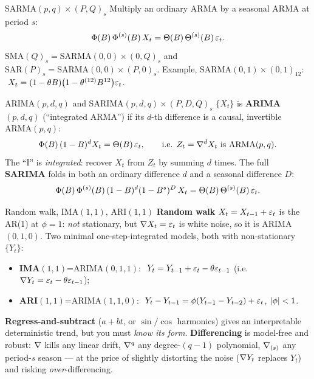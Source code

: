 \documentclass[11pt]{article}
\begin{document}
\begin{defn}{SARMA$(p,q)\times(P,Q)_s$}
Multiply an ordinary ARMA by a seasonal ARMA at period $s$:
\[
\Phi(B)\,\Phi^{(s)}(B)\,X_t=\Theta(B)\,\Theta^{(s)}(B)\,\varepsilon_t .
\]
$\mathrm{SMA}(Q)_s=\mathrm{SARMA}(0,0)\times(0,Q)_s$ and $\mathrm{SAR}(P)_s=\mathrm{SARMA}(0,0)\times(P,0)_s$. Example, $\mathrm{SARMA}(0,1)\times(0,1)_{12}$: $\ X_t=(1-\theta B)\bigl(1-\theta^{(12)}B^{12}\bigr)\varepsilon_t$.
\end{defn}

\begin{defn}{ARIMA$(p,d,q)$ and SARIMA$(p,d,q)\times(P,D,Q)_s$}
$\{X_t\}$ is \textbf{ARIMA$(p,d,q)$} (``integrated ARMA'') if its $d$-th difference is a causal, invertible ARMA$(p,q)$:
\[
\Phi(B)\,(1-B)^{d}X_t=\Theta(B)\,\varepsilon_t ,\qquad\text{i.e. } Z_t=\nabla^{d}X_t \text{ is ARMA}(p,q).
\]
The ``I'' is \emph{integrated}: recover $X_t$ from $Z_t$ by summing $d$ times. The full \textbf{SARIMA} folds in both an ordinary difference $d$ and a seasonal difference $D$:
\[
\Phi(B)\,\Phi^{(s)}(B)\,(1-B)^{d}(1-B^{s})^{D}\,X_t=\Theta(B)\,\Theta^{(s)}(B)\,\varepsilon_t .
\]
\end{defn}

\begin{defn}{Random walk, IMA$(1,1)$, ARI$(1,1)$}
\textbf{Random walk} $X_t=X_{t-1}+\varepsilon_t$ is the AR(1) at $\phi=1$: \emph{not} stationary, but $\nabla X_t=\varepsilon_t$ is white noise, so it is ARIMA$(0,1,0)$. Two minimal one-step-integrated models, both with non-stationary $\{Y_t\}$:
\begin{itemize}
\item \textbf{IMA$(1,1)$}=ARIMA$(0,1,1)$: $\ Y_t=Y_{t-1}+\varepsilon_t-\theta\varepsilon_{t-1}$ (i.e. $\nabla Y_t=\varepsilon_t-\theta\varepsilon_{t-1}$);
\item \textbf{ARI$(1,1)$}=ARIMA$(1,1,0)$: $\ Y_t-Y_{t-1}=\phi(Y_{t-1}-Y_{t-2})+\eps_t$, $\left\lvert \phi \right\rvert<1$.
\end{itemize}
\end{defn}

\begin{intu}
\textbf{Regress-and-subtract} ($a+bt$, or $\sin/\cos$ harmonics) gives an interpretable deterministic trend, but you must \emph{know its form}. \textbf{Differencing} is model-free and robust: $\nabla$ kills any linear drift, $\nabla^{q}$ any degree-$(q-1)$ polynomial, $\nabla_{(s)}$ any period-$s$ season --- at the price of slightly distorting the noise ($\nabla Y_t$ replaces $Y_t$) and risking \emph{over}-differencing.
\end{intu}
\end{document}
